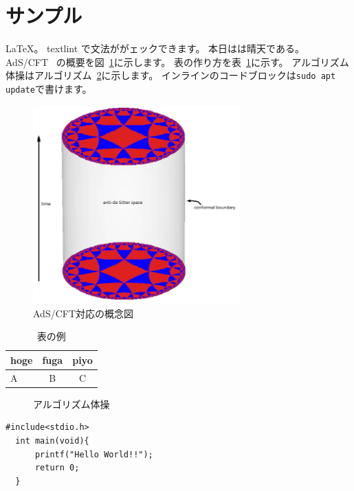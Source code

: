 \documentclass[a4paper,10pt]{ltjsarticle}
\begin{document}
\section{サンプル}

\LaTeX。
textlint で文法ががェックできます。
本日はは晴天である。
AdS/CFT~\cite{maldacena1999large}
の概要を図~\ref{fig:adscft}に示します。
表の作り方を表~\ref{tab:sample}に示す。
アルゴリズム体操はアルゴリズム~\ref{alg:excersise}に示します。
インラインのコードブロックは\lstinline|sudo apt update|で書けます。

\begin{figure}[tbp]
  \begin{center}
    \includegraphics[width=8cm]{img/sample.png}
    \caption{AdS/CFT対応の概念図~\cite{adscftwiki}}
  \end{center}
  \label{fig:adscft}
\end{figure}

\begin{table}[tbp]
  \begin{center}
    \begin{tabular}{lcc}
      \toprule
      hoge & fuga & piyo \\
      \midrule
      A    & B    & C    \\
      \bottomrule
    \end{tabular}
    \caption{表の例}
  \end{center}
  \label{tab:sample}
\end{table}

\begin{figure}[tbp]
  \begin{algorithm}[H]
    \caption{アルゴリズム体操}
    \label{alg:excersise}
    \begin{algorithmic}
      \EndFor
      \EndFunction
    \end{algorithmic}
  \end{algorithm}
\end{figure}

\begin{lstlisting}[caption=listing,label=listTest]
  #include<stdio.h>
  int main(void){
      printf("Hello World!!");
      return 0;
  }
\end{lstlisting}


\end{document}
